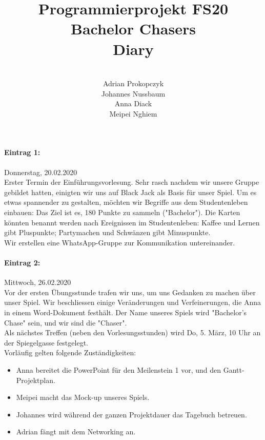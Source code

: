 \documentclass[12pt]{article}
\title{Programmierprojekt FS20\\Bachelor Chasers\\Diary}
\author{\\Adrian Prokopczyk\\Johannes Nussbaum\\Anna Diack\\Meipei Nghiem}
\date{}
\begin{document}
\begin{titlepage}

\maketitle
\thispagestyle{empty}
\setcounter{tocdepth}{2}

\end{titlepage}

\paragraph{Eintrag 1:}
Donnerstag, 20.02.2020 \\
Erster Termin der Einf\"uhrungsvorlesung. Sehr rasch nachdem wir unsere Gruppe gebildet hatten, einigten wir uns auf Black Jack als Basis für unser Spiel. Um es etwas spannender zu gestalten, m\"ochten wir Begriffe aus dem Studentenleben einbauen: Das Ziel ist es, 180 Punkte zu sammeln ("Bachelor"). Die Karten k\"onnten benannt werden nach Ereignissen im Studentenleben: Kaffee und Lernen gibt Pluspunkte; Partymachen und Schw\"anzen gibt Minuspunkte.\\
Wir erstellen eine WhatsApp-Gruppe zur Kommunikation untereinander.

\paragraph{Eintrag 2:}
Mittwoch, 26.02.2020\\
Vor der ersten \"Ubungsstunde trafen wir uns, um uns Gedanken zu machen \"uber unser Spiel. Wir beschliessen einige Veränderungen und Verfeinerungen, die Anna in einem Word-Dokument festh\"alt. Der Name unseres Spiels wird "Bachelor's Chase" sein, und wir sind die "Chaser".\\
Als n\"achstes Treffen (neben den Vorlesungsstunden) wird Do, 5. M\"arz, 10 Uhr an der Spiegelgasse festgelegt.\\
Vorl\"aufig gelten folgende Zust\"andigkeiten:
\begin{itemize}
\item Anna bereitet die PowerPoint für den Meilenstein 1 vor, und den Gantt-Projektplan.
\item Meipei macht das Mock-up unseres Spiels.
\item Johannes wird während der ganzen Projektdauer das Tagebuch betreuen.
\item Adrian f\"angt mit dem Networking an.
\end{itemize}
\end{document}
